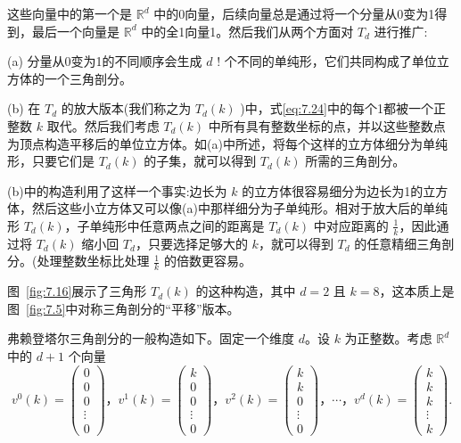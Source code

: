 这些向量中的第一个是 \({\mathbb{R}}^{d}\) 中的0向量，后续向量总是通过将一个分量从0变为1得到，最后一个向量是 \({\mathbb{R}}^{d}\) 中的全1向量1。然后我们从两个方面对 \({T}_{d}\) 进行推广:

(a) 分量从0变为1的不同顺序会生成 \(d\) ! 个不同的单纯形，它们共同构成了单位立方体的一个三角剖分。

(b) 在 \({T}_{d}\) 的放大版本(我们称之为 \({T}_{d}\left( k\right)\) )中，式\eqref{eq:7.24}中的每个1都被一个正整数 \(k\) 取代。然后我们考虑 \({T}_{d}\left( k\right)\) 中所有具有整数坐标的点，并以这些整数点为顶点构造平移后的单位立方体。如(a)中所述，将每个这样的立方体细分为单纯形，只要它们是 \({T}_{d}\left( k\right)\) 的子集，就可以得到 \({T}_{d}\left( k\right)\) 所需的三角剖分。

(b)中的构造利用了这样一个事实:边长为 \(k\) 的立方体很容易细分为边长为1的立方体，然后这些小立方体又可以像(a)中那样细分为子单纯形。相对于放大后的单纯形 \({T}_{d}\left( k\right)\)，子单纯形中任意两点之间的距离是 \({T}_{d}\left( k\right)\) 中对应距离的 \(\frac{1}{k}\)，因此通过将 \({T}_{d}\left( k\right)\) 缩小回 \({T}_{d}\)，只要选择足够大的 \(k\)，就可以得到 \({T}_{d}\) 的任意精细三角剖分。(处理整数坐标比处理 \( \frac{1}{k}\) 的倍数更容易。

图~\ref{fig:7.16}展示了三角形 \({T}_{d}\left( k\right)\) 的这种构造，其中 \(d = 2\) 且 \(k = 8\)，这本质上是图~\ref{fig:7.5}中对称三角剖分的“平移”版本。

弗赖登塔尔三角剖分的一般构造如下。固定一个维度 \(d\)。设 \(k\) 为正整数。考虑 \({\mathbb{R}}^{d}\) 中的 \(d + 1\) 个向量
\begin{equation}
{v}^{0}\left( k\right)  = \left( \begin{matrix} 0 \\  0 \\  0 \\  \vdots \\  0 \end{matrix}\right)，{v}^{1}\left( k\right)  = \left( \begin{matrix} k \\  0 \\  0 \\  \vdots \\  0 \end{matrix}\right)，{v}^{2}\left( k\right)  = \left( \begin{matrix} k \\  k \\  0 \\  \vdots \\  0 \end{matrix}\right)，\cdots，{v}^{d}\left( k\right)  = \left( \begin{matrix} k \\  k \\  k \\  \vdots \\  k \end{matrix}\right) .\label{eq:7.25}
\end{equation}

